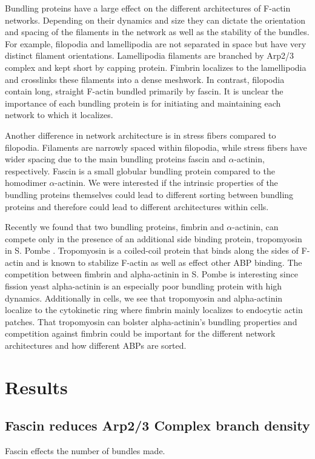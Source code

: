Bundling proteins have a large effect on the different architectures of 
F-actin networks. Depending on their dynamics and size they can dictate 
the orientation and spacing of the filaments in the network as well as 
the stability of the bundles. For example, filopodia and lamellipodia 
are not separated in space but have very distinct filament orientations. Lamellipodia filaments are branched by Arp2/3 complex and kept short by
capping protein. Fimbrin localizes to the lamellipodia and crosslinks 
these filaments into a dense meshwork. In contrast, filopodia contain long, straight F-actin bundled primarily by fascin.  It is unclear the importance
of each bundling protein is for initiating and maintaining each network
to which it localizes. 

Another difference in network architecture is in stress fibers compared to filopodia. Filaments are narrowly spaced within filopodia, while stress 
fibers have wider spacing due to the main bundling proteins fascin and 
$\alpha$-actinin, respectively. Fascin is a small globular bundling protein compared to the homodimer $\alpha$-actinin. We were interested if the intrinsic properties of the bundling proteins themselves could lead to different 
sorting between bundling proteins and therefore could lead to different
architectures within cells. 

Recently we found that two bundling proteins, fimbrin and $\alpha$-actinin, can compete only in the presence of an additional side binding protein, tropomyosin in S. Pombe \citep{christensen_competition_2017}. Tropomyosin is a coiled-coil protein that binds along the sides of F-actin and is known to stabilize F-actin as well as effect other ABP binding. The competition between fimbrin and alpha-actinin in S. Pombe is interesting since fission yeast alpha-actinin is an especially poor bundling protein with high dynamics. Additionally in cells, we see that tropomyosin and alpha-actinin localize to the cytokinetic ring where fimbrin mainly localizes to endocytic actin patches. That tropomyosin can bolster alpha-actinin’s bundling properties and competition against fimbrin could be important for the different network architectures and how different ABPs are sorted. 

\section{Results}

\subsection{Fascin reduces Arp2/3 Complex branch density}
Fascin effects the number of bundles made. 

